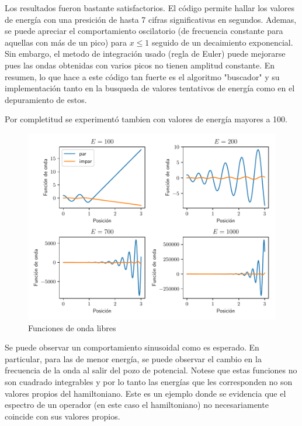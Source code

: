 \documentclass{article}
\begin{document}
Los resultados fueron bastante satisfactorios. El c\'odigo permite hallar los valores de energ\'ia con una presici\'on de hasta 7 cifras significativas en segundos. Ademas, se puede apreciar el comportamiento oscilatorio (de frecuencia constante para aquellas con m\'as de un pico) para $x\leq 1$ seguido de un decaimiento exponencial. Sin embargo, el metodo de integraci\'on usado (regla de Euler) puede mejorarse pues las ondas obtenidas con varios picos no tienen amplitud constante. En resumen, lo que hace a este c\'odigo tan fuerte es el algoritmo "buscador" y su implementaci\'on tanto en la busqueda de valores tentativos de energ\'ia como en el depuramiento de estos.

Por completitud se experiment\'o tambien con valores de energ\'ia mayores a 100.

\begin{figure}
\includegraphics[width = \textwidth]{comportamiento_libre.pdf}
\caption{Funciones de onda libres}
\end{figure}

Se puede observar un comportamiento sinusoidal como es esperado. En particular, para las de menor energ\'ia, se puede observar el cambio en la frecuencia de la onda al salir del pozo de potencial. Notese que estas funciones no son cuadrado integrables y por lo tanto las energ\'ias que les corresponden no son valores propios del hamiltoniano. Este es un ejemplo donde se evidencia que el espectro de un operador (en este caso el hamiltoniano) no necesariamente coincide con sus valores propios.
\end{document}
